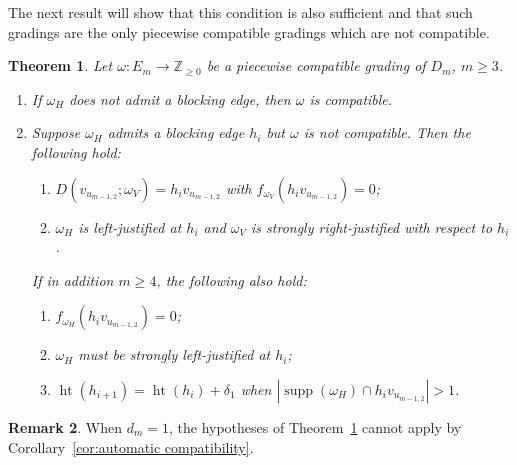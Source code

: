 \documentclass[10pt]{amsart}
\newtheorem{theorem}{Theorem}[section]
\theoremstyle{definition}
\newtheorem{remark}[theorem]{Remark}
\newcommand{\ZZ}{\mathbb{Z}}
\DeclareMathOperator{\hgt}{ht}
\DeclareMathOperator{\supp}{supp}
\begin{document}
The next result will show that this condition is also sufficient and that such gradings are the only piecewise compatible gradings which are not compatible.
\begin{theorem}
 \label{th:blocking edge conditions}
 Let $\omega:E_m\to\ZZ_{\ge0}$ be a piecewise compatible grading of $D_m$, $m\ge3$.
 \begin{enumerate}[label=(\alph*)]
 \item\label{theo3.20_1} If $\omega_H$ does not admit a blocking edge, then $\omega$ is compatible.
 \item\label{theo3.20_2} Suppose $\omega_H$ admits a blocking edge $h_i$ but $\omega$ is not compatible.
 Then the following hold:
 \begin{enumerate}[(\roman*)]
 \item\label{theo3.20_2_a} $D(v_{u_{m-1,2}};\omega_V)=h_iv_{u_{m-1,2}}$ with $f_{\omega_V}(h_iv_{u_{m-1,2}})=0$;
 \item\label{theo3.20_2_b} $\omega_H$ is left-justified at $h_i$ and $\omega_V$ is strongly right-justified with respect to $h_i$.
 \end{enumerate}
 If in addition $m\ge4$, the following also hold:
 \begin{enumerate}[(\roman*)]\addtocounter{enumii}{2}
 \item\label{theo3.20_2_c} $f_{\omega_H}(h_iv_{u_{m-1,2}})=0$;
 \item\label{theo3.20_2_d} $\omega_H$ must be strongly left-justified at $h_i$;
 \item\label{theo3.20_2_e} $\hgt(h_{i+1})=\hgt(h_i)+\delta_1$ when $|\supp(\omega_H)\cap h_iv_{u_{m-1,2}}|>1$.
 \end{enumerate}
 \end{enumerate}
\end{theorem}
\begin{remark}
 When $d_m=1$, the hypotheses of Theorem~\ref{th:blocking edge conditions} cannot apply by Corollary~\ref{cor:automatic compatibility}.
\end{remark}
\end{document}
